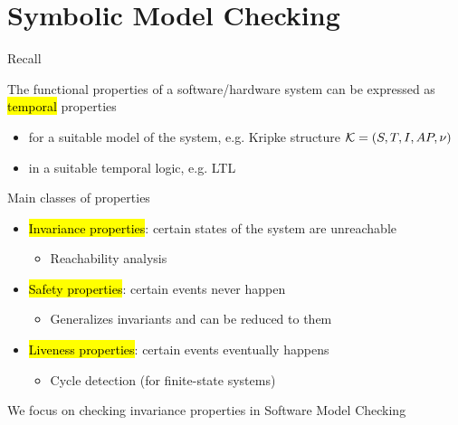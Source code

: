 
\section{Symbolic Model Checking}


\begin{frame}{Recall}

The functional properties of a software/hardware system can be expressed as
\hl{temporal} properties

\begin{itemize}
  \itemsep1em
  \item for a suitable model of the system, e.g. Kripke structure ${\cal K} = (S, T, I, AP, \nu)$
  \item in a suitable temporal logic, e.g. LTL
\end{itemize}
\end{frame}


\begin{frame}{Main classes of properties}
\begin{itemize}
  \itemsep1em
  \item \hl{Invariance properties}: certain states of the system are
  unreachable
    \begin{itemize}
      \item Reachability analysis
    \end{itemize}
  \item \hl{Safety properties}: certain events never happen
    \begin{itemize}
      \item Generalizes invariants and can be reduced to them
    \end{itemize}  
  \item \hl{Liveness properties}: certain events eventually happens
    \begin{itemize}
      \item Cycle detection (for finite-state systems)
    \end{itemize}
\end{itemize}

\bigskip
We focus on checking invariance properties in Software Model Checking
\end{frame}


